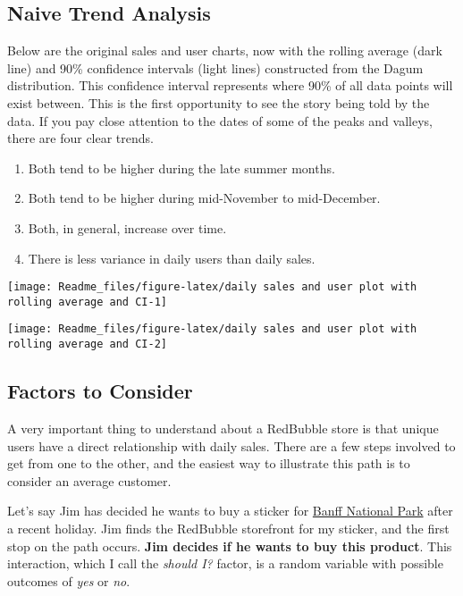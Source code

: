 \documentclass[]{article}
\providecommand{\tightlist}{%
  \setlength{\itemsep}{0pt}\setlength{\parskip}{0pt}}
\begin{document}
\subsection{Naive Trend Analysis}\label{naive-trend-analysis}

Below are the original sales and user charts, now with the rolling
average (dark line) and 90\% confidence intervals (light lines)
constructed from the Dagum distribution. This confidence interval
represents where 90\% of all data points will exist between. This is the
first opportunity to see the story being told by the data. If you pay
close attention to the dates of some of the peaks and valleys, there are
four clear trends.

\begin{enumerate}
\def\labelenumi{\arabic{enumi}.}
\tightlist
\item
  Both tend to be higher during the late summer months.
\item
  Both tend to be higher during mid-November to mid-December.
\item
  Both, in general, increase over time.
\item
  There is less variance in daily users than daily sales.
\end{enumerate}

\begin{center}\texttt{[image: Readme\_files/figure-latex/daily sales and user plot with rolling average and CI-1]} \end{center}

\begin{center}\texttt{[image: Readme\_files/figure-latex/daily sales and user plot with rolling average and CI-2]} \end{center}

\subsection{Factors to Consider}\label{factors-to-consider}

A very important thing to understand about a RedBubble store is that
unique users have a direct relationship with daily sales. There are a
few steps involved to get from one to the other, and the easiest way to
illustrate this path is to consider an average customer.

Let's say Jim has decided he wants to buy a sticker for
\href{https://www.redbubble.com/people/tysonk/works/33710123-banff-national-park-basic?asc=u\&p=sticker}{Banff
National Park} after a recent holiday. Jim finds the RedBubble
storefront for my sticker, and the first stop on the path occurs.
\textbf{Jim decides if he wants to buy this product}. This interaction,
which I call the \emph{should I?} factor, is a random variable with
possible outcomes of \emph{yes} or \emph{no}.
\end{document}
